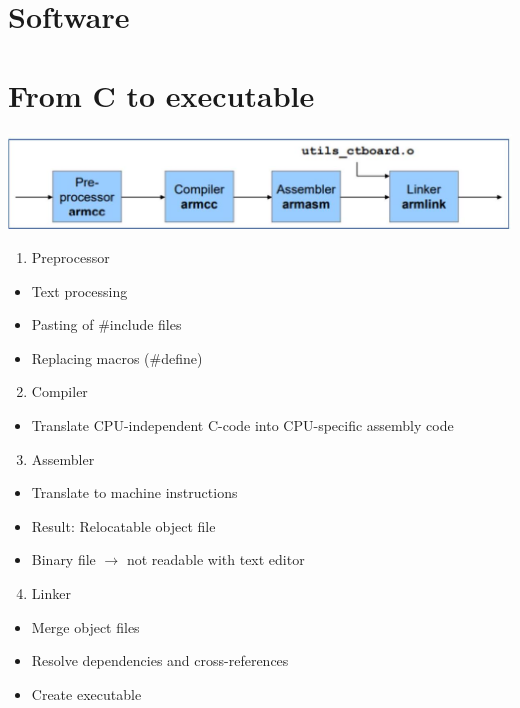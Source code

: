 \section*{Software}
\section*{From C to executable}
\begin{center}
\includegraphics[width=\linewidth]{images/2024_12_29_79e6b22f503fb7b4f718g-01}
\end{center}

\begin{enumerate}
  \item Preprocessor
\end{enumerate}

\begin{itemize}
  \item Text processing
  \item Pasting of \#include files
  \item Replacing macros (\#define)
\end{itemize}

\begin{enumerate}
  \setcounter{enumi}{1}
  \item Compiler
\end{enumerate}

\begin{itemize}
  \item Translate CPU-independent C-code into CPU-specific assembly code
\end{itemize}

\begin{enumerate}
  \setcounter{enumi}{2}
  \item Assembler
\end{enumerate}

\begin{itemize}
  \item Translate to machine instructions
  \item Result: Relocatable object file
  \item Binary file $\rightarrow$ not readable with text editor
\end{itemize}

\begin{enumerate}
  \setcounter{enumi}{3}
  \item Linker
\end{enumerate}

\begin{itemize}
  \item Merge object files
  \item Resolve dependencies and cross-references
  \item Create executable
\end{itemize}